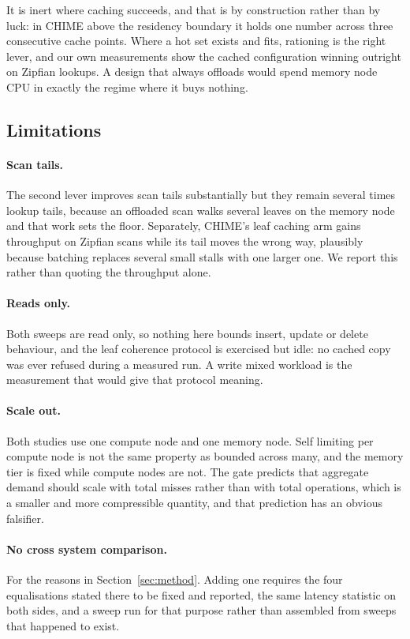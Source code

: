 \documentclass[sigconf,nonacm]{acmart}
\begin{document}
It is inert where caching succeeds, and that is by construction rather than by
luck: in CHIME above the residency boundary it holds one number across three
consecutive cache points. Where a hot set exists and fits, rationing is the right
lever, and our own measurements show the cached configuration winning outright on
Zipfian lookups. A design that always offloads would spend memory node CPU in
exactly the regime where it buys nothing.

\subsection{Limitations}
\label{sec:limits}

\paragraph{Scan tails.}
The second lever improves scan tails substantially but they remain several times
lookup tails, because an offloaded scan walks several leaves on the memory node
and that work sets the floor. Separately, CHIME's leaf caching arm gains
throughput on Zipfian scans while its tail moves the wrong way, plausibly because
batching replaces several small stalls with one larger one. We report this rather
than quoting the throughput alone.

\paragraph{Reads only.}
Both sweeps are read only, so nothing here bounds insert, update or delete
behaviour, and the leaf coherence protocol is exercised but idle: no cached copy
was ever refused during a measured run. A write mixed workload is the measurement
that would give that protocol meaning.

\paragraph{Scale out.}
Both studies use one compute node and one memory node. Self limiting per compute
node is not the same property as bounded across many, and the memory tier is
fixed while compute nodes are not. The gate predicts that aggregate demand should
scale with total misses rather than with total operations, which is a smaller and
more compressible quantity, and that prediction has an obvious falsifier.

\paragraph{No cross system comparison.}
For the reasons in Section~\ref{sec:method}. Adding one requires the four
equalisations stated there to be fixed and reported, the same latency statistic on
both sides, and a sweep run for that purpose rather than assembled from sweeps
that happened to exist.
\end{document}
